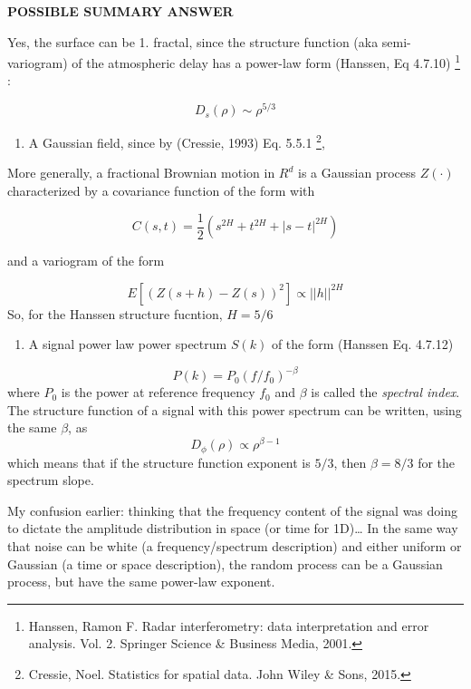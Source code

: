 \documentclass{utexasthesis}
\begin{document}
\textbf{POSSIBLE SUMMARY ANSWER}

Yes, the surface can be 1. fractal, since the structure function (aka
semi-variogram) of the atmospheric delay has a power-law form (Hanssen,
Eq 4.7.10) \footnote{Hanssen, Ramon F. Radar interferometry: data
  interpretation and error analysis. Vol. 2. Springer Science \&
  Business Media, 2001.} :

\[D_s(\rho) \sim \rho^{5/3}\]

\begin{enumerate}

\item
  A Gaussian field, since by (Cressie, 1993) Eq. 5.5.1 \footnote{Cressie,
    Noel. Statistics for spatial data. John Wiley \& Sons, 2015.},
\end{enumerate}

More generally, a fractional Brownian motion in \(R^d\) is a Gaussian
process \(Z(\cdot)\) characterized by a covariance function of the form
with

\[C(s, t) = \frac{1}{2}\left(s^{2H} + t^{2H} + |s-t|^{2H}\right)\]

and a variogram of the form

\[E[(Z(s + h) - Z(s))^2] \propto ||h||^{2H}\] So, for the Hanssen
structure fucntion, \(H=5/6\)

\begin{enumerate}
\def\labelenumi{\arabic{enumi}.}
\setcounter{enumi}{2}

\item
  A signal power law power spectrum \(S(k)\) of the form (Hanssen Eq.
  4.7.12)
\end{enumerate}

\[P(k) = P_0 \left(f/f_0\right)^{-\beta}\] where \(P_0\) is the power at
reference frequency \(f_0\) and \(\beta\) is called the \emph{spectral
index}. The structure function of a signal with this power spectrum can
be written, using the same \(\beta\), as
\[D_{\phi}(\rho) \propto \rho^{\beta-1}\] which means that if the
structure function exponent is \(5/3\), then \(\beta=8/3\) for the
spectrum slope.

My confusion earlier: thinking that the frequency content of the signal
was doing to dictate the amplitude distribution in space (or time for
1D)\ldots{} In the same way that noise can be white (a
frequency/spectrum description) and either uniform or Gaussian (a time
or space description), the random process can be a Gaussian process, but
have the same power-law exponent.
\end{document}

